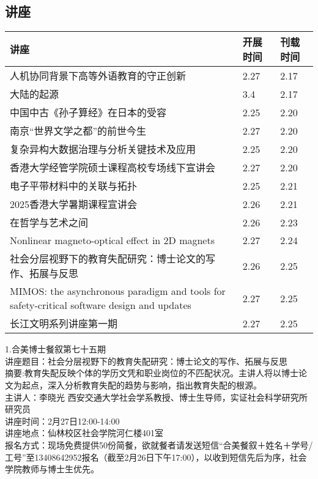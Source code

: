 \documentclass[letterpaper, 12pt]{article}
\begin{document}
\begin{multicols}{2}

\section{讲座}
\begin{tabular}{|>{\centering\arraybackslash}m{}|m{}|m{}|}
    \hline
    讲座 & 开展时间 & 刊载时间\\
    \hline\hline

  人机协同背景下高等外语教育的守正创新 & 2.27 & 2.17\\\hline
    大陆的起源 & 3.4 & 2.17\\\hline
    中国中古《孙子算经》在日本的受容 & 2.25 & 2.20\\\hline
    南京“世界文学之都”的前世今生 & 2.27 & 2.20\\\hline
    复杂异构大数据治理与分析关键技术及应用 & 2.25 & 2.20\\\hline
    香港大学经管学院硕士课程高校专场线下宣讲会 & 2.27 & 2.20\\\hline
    电子平带材料中的关联与拓扑 & 2.25 & 2.21\\\hline
    2025香港大学暑期课程宣讲会 & 2.26 & 2.21\\\hline
    在哲学与艺术之间 & 2.26 & 2.23\\\hline
    Nonlinear magneto-optical effect in 2D magnets & 2.27&2.24\\\hline
    社会分层视野下的教育失配研究：博士论文的写作、拓展与反思 & 2.26 & 2.25\\\hline
    MIMOS: the asynchronous paradigm and tools for safety-critical software design and updates & 2.27 & 2.25\\\hline
    长江文明系列讲座第一期 & 2.27 & 2.25\\\hline
    \hline
\end{tabular}
1.合美博士餐叙第七十五期\\
讲座题目：社会分层视野下的教育失配研究：博士论文的写作、拓展与反思\\
摘要:教育失配反映个体的学历文凭和职业岗位的不匹配状况。主讲人将以博士论文为起点，深入分析教育失配的趋势与影响，指出教育失配的根源。\\
主讲人：李晓光 西安交通大学社会学系教授、博士生导师，实证社会科学研究所研究员\\
讲座时间：2月27日12:00-14:00\\
讲座地点：仙林校区社会学院河仁楼401室\\
报名方式：现场免费提供50份简餐，欲就餐者请发送短信“合美餐叙＋姓名＋学号/工号”至13408642952报名（截至2月26日下午17:00），以收到短信先后为序，社会学院教师与博士生优先。\\



\end{multicols}
\end{document}
